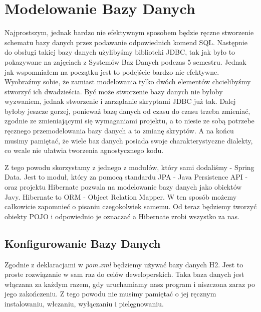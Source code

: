 \documentclass{article}
\begin{document}
    \section{Modelowanie Bazy Danych}
        Najprostszym, jednak bardzo nie efektywnym sposobem będzie ręczne stworzenie schematu bazy danych przez podawanie odpowiednich komend SQL. Następnie do obsługi takiej bazy danych użylibyśmy biblioteki JDBC, tak jak było to pokazywane na zajęciach z Systemów Baz Danych podczas 5 semestru. Jednak jak wspomniałem na początku jest to podejście bardzo nie efektywne. Wyobraźmy sobie, że zamiast modelowania tylko dwóch elementów chcielibyśmy stworzyć ich dwadzieścia. Być może stworzenie bazy danych nie byłoby wyzwaniem, jednak stworzenie i zarządanie skryptami JDBC już tak. Dalej byłoby jeszcze gorzej, ponieważ bazę danych od czasu do czasu trzeba zmieniać, zgodnie ze zmieniającymi się wymaganiami projektu, a to niesie ze sobą potrzebe ręcznego przemodelowania bazy danych a to zmianę skryptów. A na końcu musimy pamiętać, że wiele baz danych posiada swoje charakterystyczne dialekty, co wcale nie ułatwia tworzenia agnostycznego kodu. 
        
        Z tego powodu skorzystamy z jednego z modułów, który sami dodaliśmy - Spring Data. Jest to moduł, który za pomocą standardu JPA - Java Persistence API - oraz projektu Hibernate pozwala na modelowanie bazy danych jako obiektów Javy. Hibernate to ORM - Object Relation Mapper. W ten sposób możemy całkowicie zapomnieć o pisaniu czegokolwiek samemu. Od teraz będziemy tworzyć obiekty POJO i odpowiednio je oznaczać a Hibernate zrobi wszystko za nas.
        
        \subsection{Konfigurowanie Bazy Danych}
            Zgodnie z deklaracjami w \emph{pom.xml} będziemy używać bazy danych H2. Jest to proste rozwiązanie w sam raz do celów deweloperskich. Taka baza danych jest włączana za każdym razem, gdy uruchamiamy nasz program i niszczona zaraz po jego zakończeniu. Z tego powodu nie musimy pamiętać o jej ręcznym instalowaniu, włczaniu, wyłączaniu i pielęgnowaniu. 
            
\end{document}
